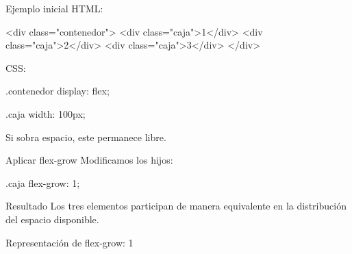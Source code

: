 \documentclass[aspectratio=169,11.5pt]{beamer}
\begin{document}
    \begin{frame}[fragile]{Ejemplo inicial}
        HTML:

        \begin{htmlcodedark}
        <div class="contenedor">
            <div class="caja">1</div>
            <div class="caja">2</div>
            <div class="caja">3</div>
        </div>
        \end{htmlcodedark}

        CSS:

        \begin{csscodedark}
            .contenedor {
                display: flex;
            }

            .caja {
                width: 100px;
            }
        \end{csscodedark}

        Si sobra espacio, este permanece libre.
    \end{frame}

    \begin{frame}[fragile]{Aplicar flex-grow}
        Modificamos los hijos:

        \begin{csscodedark}
            .caja {
                flex-grow: 1;
            }
        \end{csscodedark}

        \begin{block}{Resultado}
            Los tres elementos participan
            de manera equivalente en la distribución
            del espacio disponible.
        \end{block}
    \end{frame}

    \begin{frame}{Representación de flex-grow: 1}
        \begin{center}
        \end{center}
    \end{frame}
\end{document}
